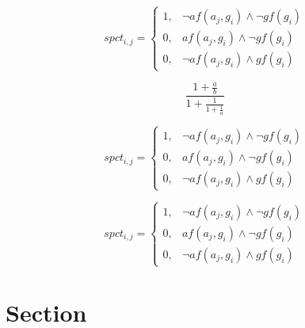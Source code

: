 \documentclass[a4paper]{article}
\begin{document}
\begin{equation}
spct_{i,j} =
\begin{cases}
1, & \text{$\neg af(a_j,g_i) \wedge \neg gf(g_i)$}\\
0, & \text{$af(a_j,g_i) \wedge \neg gf(g_i)$}\\
0, & \text{$\neg af(a_j,g_i) \wedge gf(g_i)$}
\end{cases}
\end{equation}

\[ \frac{1+\frac{a}{b}}{1+\frac{1}{1+\frac{1}{a}}} \]

\begin{equation}
spct_{i,j} =
\begin{cases}
1, & \text{$\neg af(a_j,g_i) \wedge \neg gf(g_i)$}\\
0, & \text{$af(a_j,g_i) \wedge \neg gf(g_i)$}\\
0, & \text{$\neg af(a_j,g_i) \wedge gf(g_i)$}
\end{cases}
\end{equation}

\begin{equation}
spct_{i,j} =
\begin{cases}
1, & \text{$\neg af(a_j,g_i) \wedge \neg gf(g_i)$}\\
0, & \text{$af(a_j,g_i) \wedge \neg gf(g_i)$}\\
0, & \text{$\neg af(a_j,g_i) \wedge gf(g_i)$}
\end{cases}
\end{equation}

\section{Section}
\end{document}
